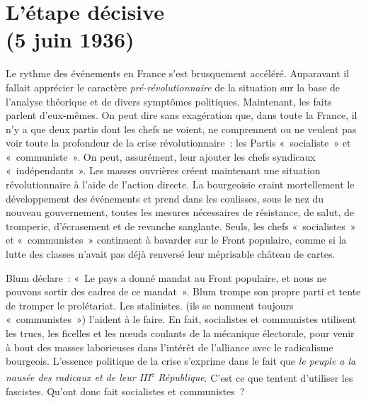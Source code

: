 \documentclass[french,twoside]{book} %
\begin{document}
 \section[{L’étape décisive, (5 juin 1936)}]{L’étape décisive \\
(5 juin 1936)}
\label{p6}\renewcommand{\leftmark}{L’étape décisive \\
(5 juin 1936)}

\noindent Le rythme des événements en France s’est brusquement accéléré. Auparavant il fallait apprécier le caractère \emph{pré-révolutionnaire} de la situation sur la base de l’analyse théorique et de divers symptômes politiques. Maintenant, les faits parlent d’eux-mêmes. On peut dire sans exagération que, dans toute la France, il n’y a que deux partis dont les chefs ne voient, ne comprennent ou ne veulent pas voir toute la profondeur de la crise révolutionnaire : les Partis « socialiste » et « communiste ». On peut, assurément, leur ajouter les chefs syndicaux « indépendants ». Les masses ouvrières créent maintenant une situation révolutionnaire à l’aide de l’action directe. La bourgeoisie craint mortellement le développement des événements et prend dans les coulisses, sous le nez du nouveau gouvernement, toutes les mesures nécessaires de résistance, de salut, de tromperie, d’écrasement et de revanche sanglante. Seuls, les chefs « socialistes » et « communistes » continuent à bavarder sur le Front populaire, comme si la lutte des classes n’avait pas déjà renversé leur méprisable château de cartes.\par
Blum déclare : « Le pays a donné mandat au Front populaire, et nous ne pouvons sortir des cadres de ce mandat ». Blum trompe son propre parti et tente de tromper le prolétariat. Les stalinistes. (ils se nomment toujours « communistes ») l’aident à le faire. En fait, socialistes et communistes utilisent les trucs, les ficelles et les nœuds  coulants de la mécanique électorale, pour venir à bout des masses laborieuses dans l’intérêt de l’alliance avec le radicalisme bourgeois. L’essence politique de la crise s’exprime dans le fait que \emph{le peuple a la nausée des radicaux et de leur III\textsuperscript{e} République}. C’est ce que tentent d’utiliser les fascistes. Qu’ont donc fait socialistes et communistes ?\par
\end{document}
